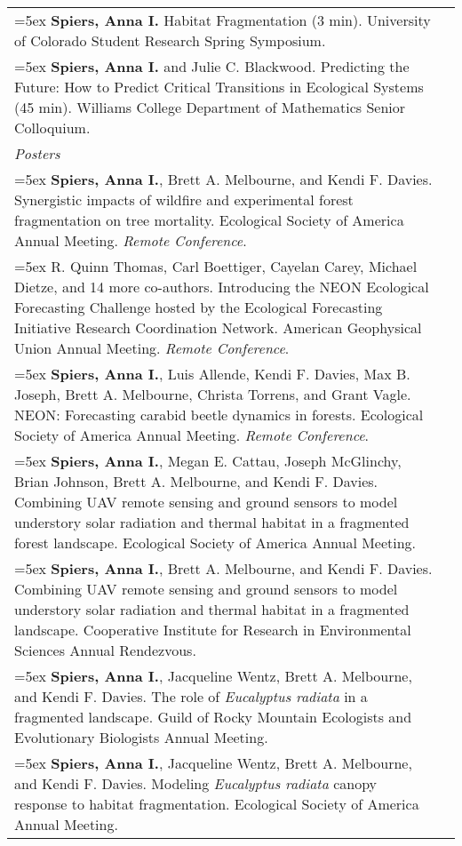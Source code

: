 \begin{longtable}{@{}>{\raggedright}p{5.25in} @{} >{\raggedleft}X@{}}
\hangindent=5ex \textbf{Spiers, Anna I.} Habitat Fragmentation (3 min). University of Colorado Student Research Spring Symposium. &  2018 \tabularnewline %

\hangindent=5ex \textbf{Spiers, Anna I.} and Julie C. Blackwood. Predicting the Future: How to Predict Critical Transitions in Ecological Systems (45 min). Williams College Department of Mathematics Senior Colloquium. &  2014 \tabularnewline %


\emph{Posters}  \tabularnewline

\hangindent=5ex \textbf{Spiers, Anna I.}, Brett A. Melbourne, and Kendi F. Davies. Synergistic impacts of wildfire and experimental forest fragmentation on tree mortality. Ecological Society of America Annual Meeting. \emph{Remote Conference}. &  2021 \tabularnewline %

\hangindent=5ex R. Quinn Thomas, Carl Boettiger, Cayelan Carey, Michael Dietze, and 14 more co-authors. Introducing the NEON Ecological Forecasting Challenge hosted by the Ecological Forecasting Initiative Research Coordination Network. American Geophysical Union Annual Meeting. \emph{Remote Conference}. &  2020 \tabularnewline %

\hangindent=5ex \textbf{Spiers, Anna I.}, Luis Allende, Kendi F. Davies, Max B. Joseph, Brett A. Melbourne, Christa Torrens, and Grant Vagle. NEON: Forecasting carabid beetle dynamics in forests. Ecological Society of America Annual Meeting. \emph{Remote Conference}. &  2020 \tabularnewline %

\hangindent=5ex \textbf{Spiers, Anna I.}, Megan E. Cattau, Joseph McGlinchy, Brian Johnson, Brett A. Melbourne, and Kendi F. Davies.  Combining UAV remote sensing and ground sensors to model understory solar radiation and thermal habitat in a fragmented forest landscape. Ecological Society of America Annual Meeting. &  2019 \tabularnewline %

\hangindent=5ex \textbf{Spiers, Anna I.}, Brett A. Melbourne, and Kendi F. Davies.  Combining UAV remote sensing and ground sensors to model understory solar radiation and thermal habitat in a fragmented landscape. Cooperative Institute for Research in Environmental Sciences Annual Rendezvous. &  2019 \tabularnewline %

\hangindent=5ex \textbf{Spiers, Anna I.}, Jacqueline Wentz, Brett A. Melbourne, and Kendi F. Davies.  The role of \emph{Eucalyptus radiata} in a fragmented landscape. Guild of Rocky Mountain Ecologists and Evolutionary Biologists Annual Meeting. &  2018 \tabularnewline %

\hangindent=5ex \textbf{Spiers, Anna I.}, Jacqueline Wentz, Brett A. Melbourne, and Kendi F. Davies.  Modeling \emph{Eucalyptus radiata} canopy response to habitat fragmentation. Ecological Society of America Annual Meeting. &  2018 \tabularnewline %

\end{longtable}
